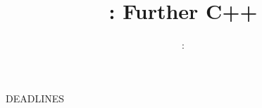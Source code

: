 \usepackage{../../beamerthemeFalmouthGamesAcademy}
\usepackage{multimedia}
\graphicspath{ {../../} }


\usepackage[normalem]{ulem}
\usepackage{wasysym}

\usepackage{pdfpages}

\usetikzlibrary{arrows,automata}




\title{\sessionnumber: Further C++}
\subtitle{\modulecode: \moduletitle}

\frame{\titlepage} 


\begin{frame}
	\centering\Huge DEADLINES
\end{frame}

%





